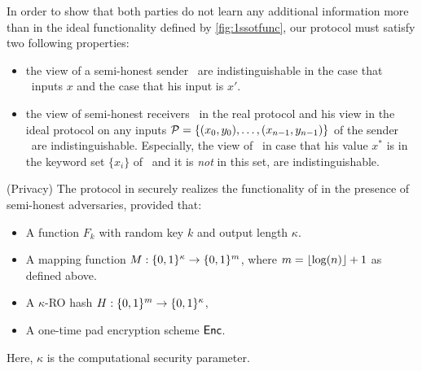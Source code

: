 In order to show that both parties do not learn any additional information more than in the ideal functionality defined by \ref{fig:1ssotfunc}, our protocol must satisfy two following properties:
\begin{itemize}
	\item the view of a semi-honest sender \SS\ are indistinguishable in the case that \RR\  inputs $x$ and the case that his input is $x'$.  
	\item  the view of semi-honest receivers \RR\ in the real protocol and his view in the ideal protocol on any inputs $\P=\{ (x_0, y_0), \ldots, (x_{n-1}, y_{n-1}) \}$ of the sender \SS\ are indistinguishable. Especially, the view of \RR\ in case that his value $x^*$ is in the keyword set $\{x_i\}$ of \SS\ and it is \textit{not} in this set, are indistinguishable.
\end{itemize}


\begin{theorem}(Privacy)
	\label{thm:sotpriv}
	The \OPPRF protocol in  securely realizes the  functionality of  in the presence of semi-honest adversaries, provided that:
	\begin{itemize}\addtolength{\itemsep}{-6pt}
		\item  A \batchOPRF function $F_k$ with random key $k$ and output length $\kappa$.
		\item A mapping function $M:\bool^\kappa \to \bool^m$, where $m=\floor{\log(n)}+1$ as defined above.
		\item A $\kappa$-RO hash  $H:\bool^m \to \bool^\kappa$, 
		\item A one-time pad encryption scheme $\Enc$.
	\end{itemize}
	Here,  $\kappa$ is the computational security parameter.
\end{theorem}

